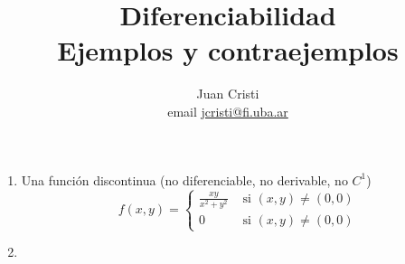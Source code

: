 \documentclass[12pt,a4paper]{article}
\author{Juan Cristi \\ email \href{mailto:jcristi@fi.uba.ar}{jcristi@fi.uba.ar}} %
\title{Diferenciabilidad\\ Ejemplos y contraejemplos}
\newcommand{\si}{\text{ si }}
\begin{document}
\maketitle

\begin{enumerate}
    \item Una función discontinua (no diferenciable, no derivable, no $C^1$)
    \[f(x,y)=\begin{cases}
    \frac{xy}{x^2+y^2} & \si (x,y)  \neq (0,0)\\
    0 & \si (x,y)  \neq (0,0)
    \end{cases}
    \]
    
    \item 
\end{enumerate}
\end{document}
